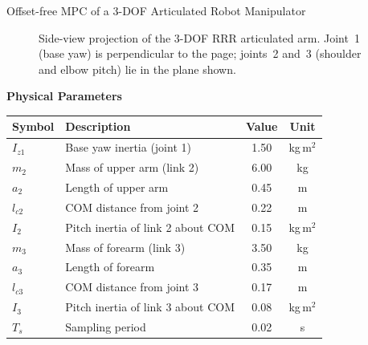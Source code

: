 \begin{examplebox}{Offset-free MPC of a 3-DOF Articulated Robot Manipulator}
\begin{figure}[H]
		\caption{Side-view projection of the 3-DOF RRR articulated arm.
			Joint~1 (base yaw) is perpendicular to the page; joints~2 and~3
			(shoulder and elbow pitch) lie in the plane shown.}
		\label{fig:3dof_arm}
	\end{figure}
	
	\textbf{\textsf{Physical Parameters}}
	
	
	\begin{center}
		\begin{tabular}{llcc}
			\toprule
			Symbol & Description & Value & Unit \\
			\midrule
			$I_{z1}$  & Base yaw inertia (joint 1)         & 1.50  & kg\,m$^{2}$ \\
			$m_2$     & Mass of upper arm (link 2)          & 6.00  & kg          \\
			$a_2$     & Length of upper arm                  & 0.45  & m           \\
			$l_{c2}$  & COM distance from joint 2           & 0.22  & m           \\
			$I_2$     & Pitch inertia of link 2 about COM   & 0.15  & kg\,m$^{2}$ \\
			$m_3$     & Mass of forearm (link 3)            & 3.50  & kg          \\
			$a_3$     & Length of forearm                    & 0.35  & m           \\
			$l_{c3}$  & COM distance from joint 3           & 0.17  & m           \\
			$I_3$     & Pitch inertia of link 3 about COM   & 0.08  & kg\,m$^{2}$ \\
			$T_s$     & Sampling period                      & 0.02  & s           \\
			\bottomrule
		\end{tabular}
	\end{center}
	

\end{examplebox}
